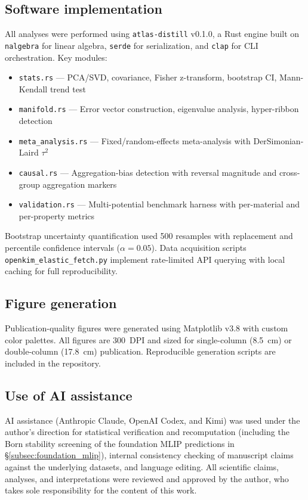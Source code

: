 \documentclass[twocolumn,10pt]{article}
\begin{document}
\subsection{Software implementation}

All analyses were performed using \texttt{atlas-distill} v0.1.0, a Rust engine built on \texttt{nalgebra} for linear algebra, \texttt{serde} for serialization, and \texttt{clap} for CLI orchestration. Key modules:
\begin{itemize}
\item \texttt{stats.rs} --- PCA/SVD, covariance, Fisher z-transform, bootstrap CI, Mann-Kendall trend test
\item \texttt{manifold.rs} --- Error vector construction, eigenvalue analysis, hyper-ribbon detection
\item \texttt{meta\_analysis.rs} --- Fixed/random-effects meta-analysis with DerSimonian-Laird $\tau^2$
\item \texttt{causal.rs} --- Aggregation-bias detection with reversal magnitude and cross-group aggregation markers
\item \texttt{validation.rs} --- Multi-potential benchmark harness with per-material and per-property metrics
\end{itemize}

Bootstrap uncertainty quantification used 500 resamples with replacement and percentile confidence intervals ($\alpha = 0.05$). Data acquisition scripts \texttt{openkim\_elastic\_fetch.py} implement rate-limited API querying with local caching for full reproducibility.

\subsection{Figure generation}

Publication-quality figures were generated using Matplotlib v3.8 with custom color palettes. All figures are 300~DPI and sized for single-column (8.5~cm) or double-column (17.8~cm) publication. Reproducible generation scripts are included in the repository.

\subsection{Use of AI assistance}

AI assistance (Anthropic Claude, OpenAI Codex, and Kimi) was used under the author's direction for statistical verification and recomputation (including the Born stability screening of the foundation MLIP predictions in \S\ref{subsec:foundation_mlip}), internal consistency checking of manuscript claims against the underlying datasets, and language editing. All scientific claims, analyses, and interpretations were reviewed and approved by the author, who takes sole responsibility for the content of this work.
\end{document}
